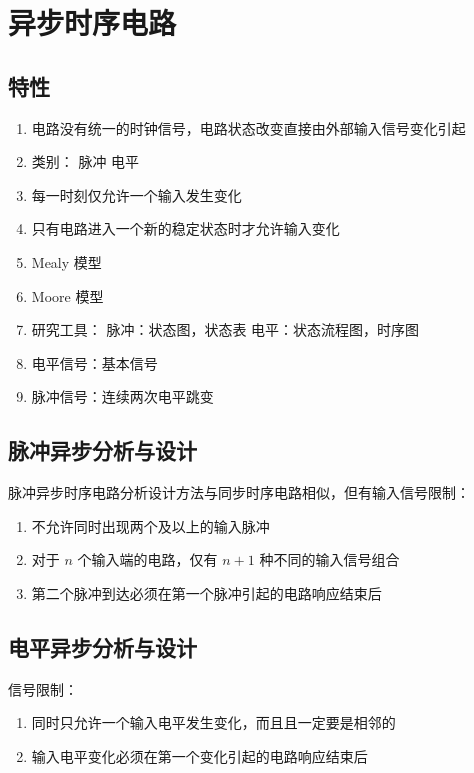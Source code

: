 \chapter{异步时序电路}
\newpage

\section{特性}
\begin{enumerate}
    \item 电路没有统一的时钟信号，电路状态改变直接由外部输入信号变化引起
    \item 类别：
        脉冲
        电平
    \item 每一时刻仅允许一个输入发生变化
    \item 只有电路进入一个新的稳定状态时才允许输入变化
    \item Mealy 模型
    \item Moore 模型
    \item 研究工具：
        脉冲：状态图，状态表
        电平：状态流程图，时序图
    \item 电平信号：基本信号
    \item 脉冲信号：连续两次电平跳变
\end{enumerate}


\section{脉冲异步分析与设计}

脉冲异步时序电路分析设计方法与同步时序电路相似，但有输入信号限制：
\begin{enumerate}
    \item 不允许同时出现两个及以上的输入脉冲
    \item 对于 $n$ 个输入端的电路，仅有 $n+1$ 种不同的输入信号组合
    \item 第二个脉冲到达必须在第一个脉冲引起的电路响应结束后 
\end{enumerate}

\section{电平异步分析与设计}

信号限制：
\begin{enumerate}
    \item 同时只允许一个输入电平发生变化，而且且一定要是相邻的
    \item 输入电平变化必须在第一个变化引起的电路响应结束后
\end{enumerate}

